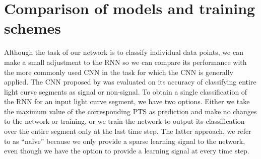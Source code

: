 \section{Comparison of models and training schemes}
\label{sec:models}

Although the task of our network is to classify individual data points, we can make a small adjustment to the RNN so we can compare its performance with the more commonly used CNN in the task for which the CNN is generally applied. The CNN proposed by \cite{pearson2018searching} was evaluated on its accuracy of classifying entire light curve segments as signal or non-signal. To obtain a single classification of the RNN for an input light curve segment, we have two options. Either we take the maximum value of the corresponding PTS as prediction and make no changes to the network or training, or we train the network to output its classification over the entire segment only at the last time step. The latter approach, we refer to as ``naive'' because we only provide a sparse learning signal to the network, even though we have the option to provide a learning signal at every time step. 

